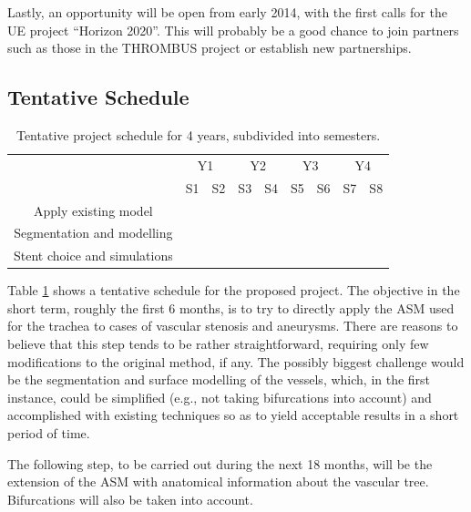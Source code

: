 \documentclass[a4paper]{article}
\begin{document}
Lastly, an opportunity will be open from early 2014, with the first calls for the UE project ``Horizon 2020''. This will probably be a good chance to join partners such as those in the THROMBUS project or establish new partnerships. 

\subsection{Tentative Schedule}

\begin{table}[h]\centering
\begin{tabular}{c|c|c|c|c|c|c|c|c|}
\cline{2-9}
 & \multicolumn{2}{|c|}{Y1} & \multicolumn{2}{|c|}{Y2} & \multicolumn{2}{|c|}{Y3} & \multicolumn{2}{|c|}{Y4} \\ \cline{2-9}
 & S1 & S2 & S3 & S4 & S5 & S6 & S7 & S8  \\ \hline
\multicolumn{1}{|c|}{Apply existing model} & \cellcolor{green} & & & & & & & \\ \hline
\multicolumn{1}{|c|}{Segmentation and modelling} & & \cellcolor{green} & \cellcolor{green} & \cellcolor{green} & & & & \\ \hline
\multicolumn{1}{|c|}{Stent choice and simulations} & & & & & \cellcolor{green} & \cellcolor{green} & \cellcolor{green} & \cellcolor{green} \\ \hline
\end{tabular}
\caption{Tentative project schedule for 4 years, subdivided into semesters.}
\label{tab:schedule}
\end{table}

Table \ref{tab:schedule} shows a tentative schedule for the proposed project. The objective in the short term, roughly the first 6 months, is to try to directly apply the ASM used for the trachea to cases of vascular stenosis and aneurysms. There are reasons to believe that this step tends to be rather straightforward, requiring only few modifications to the original method, if any. The possibly biggest challenge would be the segmentation and surface modelling of the vessels, which, in the first instance, could be simplified (e.g., not taking bifurcations into account) and accomplished with existing techniques so as to yield acceptable results in a short period of time. 

The following step, to be carried out during the next 18 months, will be the extension of the ASM with anatomical information about the vascular tree. Bifurcations will also be taken into account. 
\end{document}
